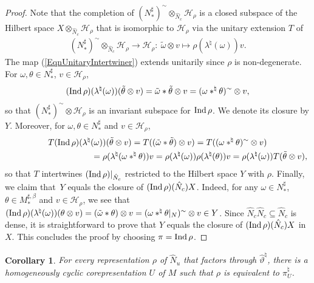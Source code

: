 \documentclass[pdftex]{sigma}
\numberwithin{equation}{section}
\newtheorem{cor}[thm]{Corollary}
\theoremstyle{definition}
\newcommand{\cHil}{\mathcal{H}}
\newcommand{\Ind}{{\rm Ind}\,}
\begin{document}
\begin{proof}
 Note that the completion of $  (N_\ast^{\sharp})^{\sim}   \otimes_{\hat{N}_c}  \cHil_\rho$ is a closed subspace of the Hilbert space $X  \otimes_{\hat{N}_c} \cHil_\rho$ that is isomorphic to $\cHil_\rho$ via the unitary  extension $T$ of
\begin{gather}\label{EqnUnitaryIntertwiner}
( N_\ast^\sharp) ^\sim  \otimes_{\hat{N}_c} \cHil_\rho \rightarrow \cHil_\rho: \ \tilde{\omega} \otimes v \mapsto \rho(\lambda ^\natural(\omega)) v.
\end{gather}
The map (\ref{EqnUnitaryIntertwiner}) extends unitarily since $\rho$ is non-degenerate. For $\omega, \theta \in N_\ast^\sharp$, $v \in \cHil_\rho$,
\[
(\Ind \rho)(\lambda^\natural(\omega))  (\tilde{\theta} \otimes v) = \tilde{\omega} \ast \tilde{\theta} \otimes v = (\omega \ast^\natural \theta)^\sim \otimes v,
\]
 so that $(N_\ast^\sharp)^\sim  \otimes \cHil_\rho$ is an invariant subspace for $ \Ind \rho $. We denote its closure by $Y$. Moreover, for $\omega, \theta \in N_\ast^\sharp$ and $v \in \cHil_\rho$,
\begin{gather*}
  T    (\Ind \rho)  (\lambda^\natural(\omega))   ( \tilde{\theta} \otimes v )  =
T ((\tilde{\omega} \ast \tilde{\theta})  \otimes v)  = T ((\omega \ast^\natural \theta)^\sim \otimes v)  \\
\phantom{T    (\Ind \rho)  (\lambda^\natural(\omega))   ( \tilde{\theta} \otimes v ) }{}
=   \rho(\lambda^\natural(\omega \ast^\natural \theta)) v  =   \rho(\lambda^\natural(\omega)) \rho(\lambda^\natural( \theta)) v =
  \rho(\lambda^\natural(\omega)) T  ( \tilde{\theta} \otimes v ),
\end{gather*}
so that $T$ intertwines  $ (\Ind \rho)\vert_{\hat{N}_c}  $ restricted to the Hilbert space   $Y$ with $\rho$. Finally, we claim that~$Y$ equals the closure of $(\Ind\rho)(\hat{N}_c) X$. Indeed, for any $\omega \in N_\ast^\sharp$, $\theta \in M_\ast^{\sharp, \beta}$ and $v \in \cHil_\rho$, we see that $(\Ind\rho)(\lambda^\natural(\omega)) ( \theta \otimes v) = (\tilde{\omega} \ast \theta) \otimes v = (\omega \ast^\natural \theta\vert_N)^\sim \otimes v \in Y$. Since $\hat{N}_c \hat{N}_c \subseteq \hat{N}_c$ is dense, it is straightforward to prove that  $Y$ equals the closure of $(\Ind\rho)(\hat{N}_c) X$ in $X$. This concludes the proof by choosing $\pi = \Ind \rho$.
\end{proof}

\begin{cor}\label{CorRep}
For every representation $\rho$ of $\hat{N}_u$ that factors through $\hat{\vartheta}^\natural$, there is a homogeneously cyclic corepresentation $U$ of $M$ such that $\rho$ is equivalent to $\pi_U^\natural$.
\end{cor}
\end{document}

